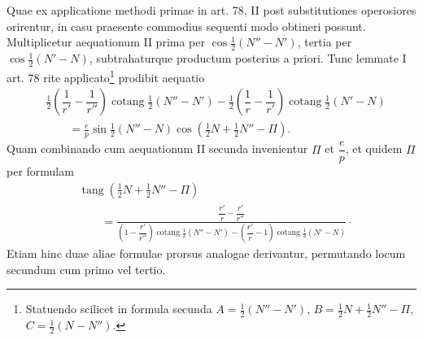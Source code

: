 Quae ex applicatione methodi primae in art. 78, II post substitutiones operosiores orirentur, in casu praesente commodius sequenti modo obtineri possunt. Multiplicetur aequationum II prima per $\cos\tfrac12(N''-N')$, tertia per $\cos\tfrac12(N'-N)$, subtrahaturque productum posterius a priori. Tunc lemmate I art. 78 rite applicato\footnote{Statuendo scilicet in formula secunda $A=\tfrac12(N''-N')$, $B=\tfrac12N+\tfrac12N''-\Pi$, $C=\tfrac12(N-N'')$.} prodibit aequatio
\[
\begin{aligned}
&\tfrac12\left(\dfrac1{r'}-\dfrac1{r''}\right)\operatorname{cotang}\tfrac12(N''-N')-\tfrac12\left(\dfrac1r-\dfrac1{r'}\right)\operatorname{cotang}\tfrac12(N'-N)\\[4pt]
&\qquad=\frac{e}{p}\sin\tfrac12(N''-N)\cos(\tfrac12N+\tfrac12N''-\Pi).
\end{aligned}
\]
Quam combinando cum aequationum II secunda invenientur $\Pi$ et $\dfrac{e}{p}$, et quidem $\Pi$ per formulam
\[
\begin{aligned}
&\operatorname{tang}(\tfrac12N+\tfrac12N''-\Pi)\\[4pt]
&\qquad=\frac{\dfrac{r'}r-\dfrac{r'}{r''}}{\left(1-\dfrac{r'}{r''}\right)\operatorname{cotang}\tfrac12(N''-N')-\left(\dfrac{r'}r-1\right)\operatorname{cotang}\tfrac12(N'-N)}\mathpunct{\cdot}
\end{aligned}
\]
Etiam hinc duae aliae formulae prorsus analogae derivantur, permutando locum secundum cum primo vel tertio.
